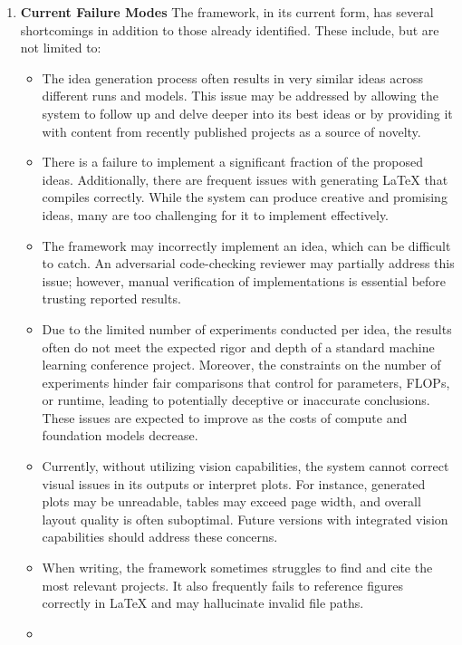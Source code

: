 \begin{enumerate}
    \item \textbf{Current Failure Modes}  The framework, in its current form, has several shortcomings in addition to those already identified. These include, but are not limited to:
    \begin{itemize}
        \item 
        The idea generation process often results in very similar ideas across different runs and models. This issue may be addressed by allowing the system to follow up and delve deeper into its best ideas or by providing it with content from recently published projects as a source of novelty.
        \item 
        There is a failure to implement a significant fraction of the proposed ideas. Additionally, there are frequent issues with generating LaTeX that compiles correctly. While the system can produce creative and promising ideas, many are too challenging for it to implement effectively.
        \item 
        The framework may incorrectly implement an idea, which can be difficult to catch. An adversarial code-checking reviewer may partially address this issue; however, manual verification of implementations is essential before trusting reported results.
        \item 

        Due to the limited number of experiments conducted per idea, the results often do not meet the expected rigor and depth of a standard machine learning conference project. Moreover, the constraints on the number of experiments hinder fair comparisons that control for parameters, FLOPs, or runtime, leading to potentially deceptive or inaccurate conclusions. These issues are expected to improve as the costs of compute and foundation models decrease.
        \item 

        Currently, without utilizing vision capabilities, the system cannot correct visual issues in its outputs or interpret plots. For instance, generated plots may be unreadable, tables may exceed page width, and overall layout quality is often suboptimal. Future versions with integrated vision capabilities should address these concerns.
        \item 

        When writing, the framework sometimes struggles to find and cite the most relevant projects. It also frequently fails to reference figures correctly in LaTeX and may hallucinate invalid file paths.
        \item 


\end{itemize}
\end{enumerate}
